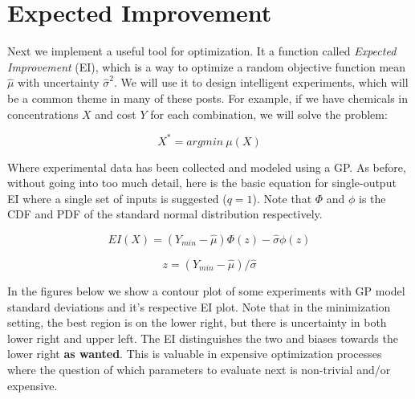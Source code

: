 \documentclass[12pt]{article}
\begin{document}
\section{Expected Improvement}

Next we implement a useful tool for optimization. It a function called \emph{Expected Improvement} (EI), which is a way to optimize a random objective function mean $\hat{\mu}$ with uncertainty $\hat{\sigma}^2$. We will use it to design intelligent experiments, which will be a common theme in many of these posts. For example, if we have chemicals in concentrations $X$ and cost $Y$ for each combination, we will solve the problem:

\begin{equation}
X^* = argmin\:\mu(X)
\end{equation}

\vspace{5mm}

Where experimental data has been collected and modeled using a GP. As before, without going into too much detail, here is the basic equation for single-output EI where a single set of inputs is suggested ($q=1$). Note that $\Phi$ and $\phi$ is the CDF and PDF of the standard normal distribution respectively. 

\begin{equation}
EI(X) = (Y_{min}-\hat{\mu})\Phi(z) - \hat{\sigma}\phi(z)
\end{equation}

\begin{equation}
z =  (Y_{min}-\hat{\mu})/\hat{\sigma}
\end{equation}

In the figures below we show a contour plot of some experiments with GP model standard deviations and it's respective EI plot. Note that in the minimization setting, the best region is on the lower right, but there is uncertainty in both lower right and upper left. The EI distinguishes the two and biases towards the lower right \textbf{as wanted}. This is valuable in expensive optimization processes where the question of which parameters to evaluate next is non-trivial and/or expensive.

\begin{figure}
\centering
{}
\end{figure}
\end{document}
